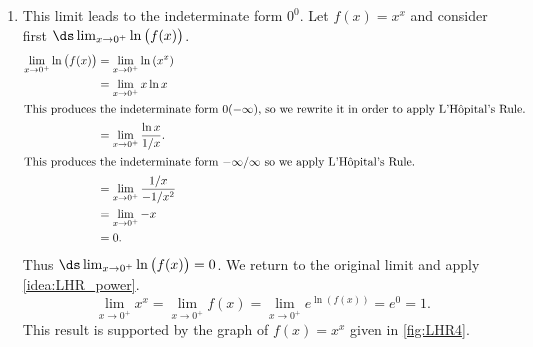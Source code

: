 \begin{example}
\begin{enumerate}
\item		This limit leads to the indeterminate form $0^0$. Let $f(x) = x^x$ and consider first $\ds\lim_{x\to0^+} \ln\big(f(x)\big)$. 
%
%
%
\begin{align*}
\lim_{x\to0^+} \ln\big(f(x)\big) &= \lim_{x\to0^+} \ln\left(x^x\right) \\
			&= \lim_{x\to0^+} x\ln x \\
			\intertext{This produces the indeterminate form $0(-\infty)$, so we rewrite it in order to apply L'H\^opital's Rule.}
			&= \lim_{x\to0^+} \frac{\ln x}{1/x}.\\
			\intertext{This produces the indeterminate form $-\infty/\infty$ so we apply L'H\^opital's Rule.}
			&=	\lim_{x\to0^+} \frac{1/x}{-1/x^2} \\
			&= \lim_{x\to0^+} -x \\
			&= 0.
\end{align*}%
Thus $\ds\lim_{x\to0^+} \ln\big(f(x)\big) =0$. We return to the original limit and apply \autoref{idea:LHR_power}.
\[
\lim_{x\to0^+} x^x = \lim_{x\to0^+} f(x) = \lim_{x\to0^+} e^{\ln(f(x))} = e^0 = 1.
\]
This result is supported by the graph of $f(x)=x^x$ given in \autoref{fig:LHR4}.\eoehere
\end{enumerate}
\end{example}



